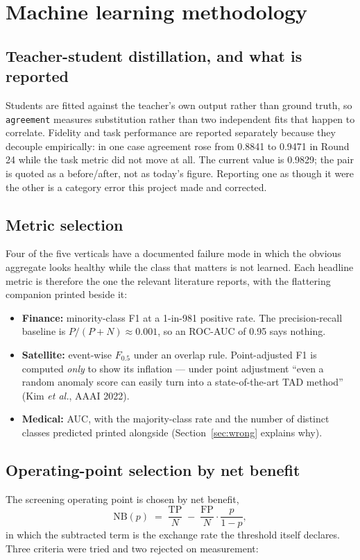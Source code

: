 \documentclass[11pt,a4paper]{article}
\begin{document}
\section{Machine learning methodology}

\subsection{Teacher-student distillation, and what is reported}
Students are fitted against the teacher's own output rather than ground truth, so
\texttt{agreement} measures substitution rather than two independent fits that happen to correlate.
Fidelity and task performance are reported separately because they decouple empirically: in one case
agreement rose from 0.8841 to 0.9471 in Round 24 while the task metric did not move at all. The current value is 0.9829; the pair is quoted as a before/after, not as today's figure. Reporting one as
though it were the other is a category error this project made and corrected.

\subsection{Metric selection}
Four of the five verticals have a documented failure mode in which the obvious aggregate looks
healthy while the class that matters is not learned. Each headline metric is therefore the one the
relevant literature reports, with the flattering companion printed beside it:

\begin{itemize}
  \item \textbf{Finance:} minority-class F1 at a 1-in-981 positive rate. The precision-recall
        baseline is $P/(P{+}N)\approx0.001$, so an ROC-AUC of 0.95 says nothing.
  \item \textbf{Satellite:} event-wise $F_{0.5}$ under an overlap rule. Point-adjusted F1 is computed
        \emph{only} to show its inflation --- under point adjustment ``even a random anomaly score can
        easily turn into a state-of-the-art TAD method'' (Kim \emph{et al.}, AAAI 2022).
  \item \textbf{Medical:} AUC, with the majority-class rate and the number of distinct classes
        predicted printed alongside (Section~\ref{sec:wrong} explains why).
\end{itemize}

\subsection{Operating-point selection by net benefit}
\label{sec:netbenefit}
The screening operating point is chosen by net benefit,
\[
  \mathrm{NB}(p) \;=\; \frac{\mathrm{TP}}{N} \;-\; \frac{\mathrm{FP}}{N}\cdot\frac{p}{1-p},
\]
in which the subtracted term is the exchange rate the threshold itself declares. Three criteria were
tried and two rejected on measurement:
\end{document}
